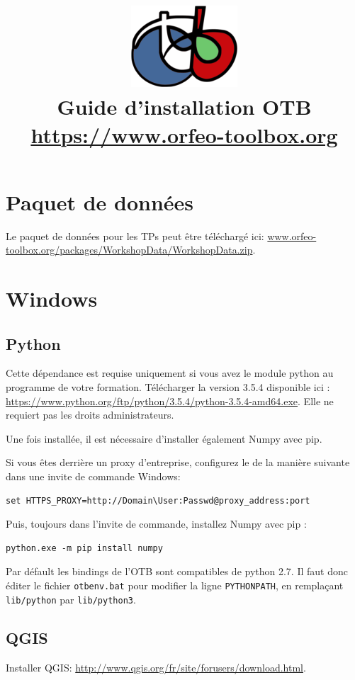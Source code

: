 \documentclass[10pt,a4paper]{article}
\title{\includegraphics[scale=1]{Art/otb-logo.png}\\
  Guide d'installation OTB\\
  {\small\url{https://www.orfeo-toolbox.org}}
}
\begin{document}
\maketitle

\tableofcontents

\clearpage
\section{Paquet de données}

Le paquet de données pour les TPs peut être téléchargé ici: \url{www.orfeo-toolbox.org/packages/WorkshopData/WorkshopData.zip}.

\section{Windows}

\subsection{Python}

Cette dépendance est requise uniquement si vous avez le module python au programme de votre formation. Télécharger la version 3.5.4 disponible ici : \url{https://www.python.org/ftp/python/3.5.4/python-3.5.4-amd64.exe}. Elle ne requiert pas les droits administrateurs.

Une fois installée, il est nécessaire d'installer également Numpy avec pip.

Si vous êtes derrière un proxy d'entreprise, configurez le de la manière suivante dans une invite de commande Windows:

\begin{verbatim}
set HTTPS_PROXY=http://Domain\User:Passwd@proxy_address:port
\end{verbatim}

Puis, toujours dans l'invite de commande, installez Numpy avec pip :

\begin{verbatim}
python.exe -m pip install numpy
\end{verbatim}

Par défault les bindings de l'OTB sont compatibles de python 2.7. Il faut donc éditer le fichier \verb?otbenv.bat? pour modifier la ligne \verb?PYTHONPATH?, en remplaçant \verb?lib/python? par \verb?lib/python3?.

\subsection{QGIS}
Installer QGIS: \url{http://www.qgis.org/fr/site/forusers/download.html}.
\end{document}
